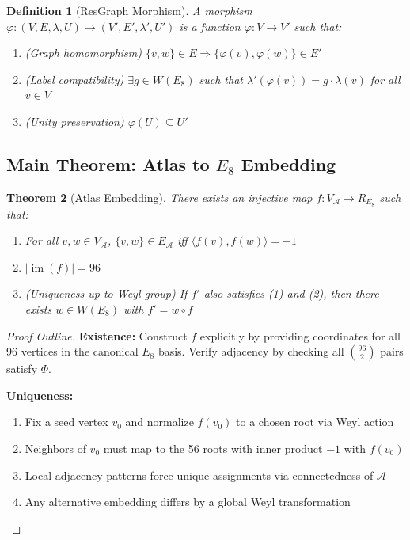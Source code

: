 \documentclass[12pt]{article}
\newtheorem{theorem}{Theorem}
\newtheorem{definition}[theorem]{Definition}
\newcommand{\A}{\mathcal{A}}
\newcommand{\Weyl}{W}
\newcommand{\PhiAdj}{\Phi}
\begin{document}
\begin{definition}[ResGraph Morphism]
A morphism $\varphi: (V,E,\lambda,U) \to (V',E',\lambda',U')$ is a function $\varphi: V \to V'$ such that:
\begin{enumerate}
\item (Graph homomorphism) $\{v,w\} \in E \Rightarrow \{\varphi(v), \varphi(w)\} \in E'$
\item (Label compatibility) $\exists g \in \Weyl(E_8)$ such that $\lambda'(\varphi(v)) = g \cdot \lambda(v)$ for all $v \in V$
\item (Unity preservation) $\varphi(U) \subseteq U'$
\end{enumerate}
\end{definition}

\subsection{Main Theorem: Atlas to $E_8$ Embedding}

\begin{theorem}[Atlas Embedding]
There exists an injective map $f: V_\A \to R_{E_8}$ such that:
\begin{enumerate}
\item For all $v,w \in V_\A$, $\{v,w\} \in E_\A$ iff $\langle f(v), f(w) \rangle = -1$
\item $|\operatorname{im}(f)| = 96$
\item (Uniqueness up to Weyl group) If $f'$ also satisfies (1) and (2), then there exists $w \in \Weyl(E_8)$ with $f' = w \circ f$
\end{enumerate}
\end{theorem}

\begin{proof}[Proof Outline]
\textbf{Existence:} Construct $f$ explicitly by providing coordinates for all 96 vertices in the canonical $E_8$ basis. Verify adjacency by checking all $\binom{96}{2}$ pairs satisfy $\PhiAdj$.

\textbf{Uniqueness:} 
\begin{enumerate}
\item Fix a seed vertex $v_0$ and normalize $f(v_0)$ to a chosen root via Weyl action
\item Neighbors of $v_0$ must map to the 56 roots with inner product $-1$ with $f(v_0)$
\item Local adjacency patterns force unique assignments via connectedness of $\A$
\item Any alternative embedding differs by a global Weyl transformation
\end{enumerate}
\end{proof}
\end{document}

